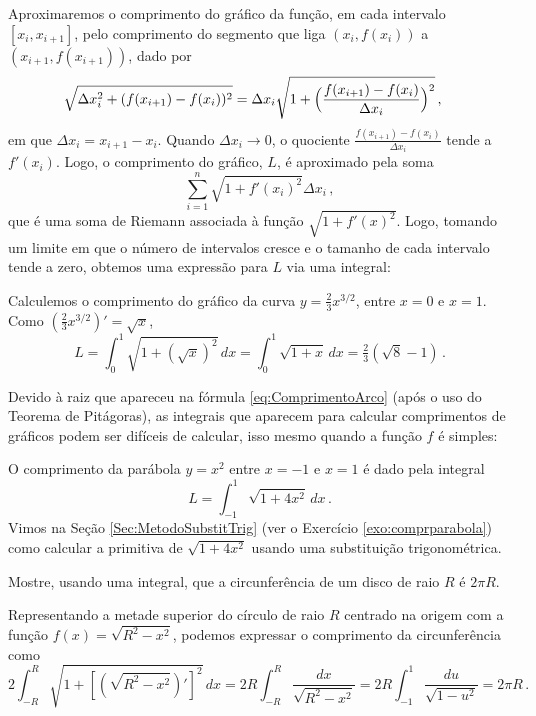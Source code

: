Aproximaremos o comprimento do gráfico da função, 
em cada intervalo $[x_i,x_{i+1}]$, pelo comprimento do segmento que liga 
$(x_i,f(x_i))$ a $(x_{i+1},f(x_{i+1}))$, dado por 
\begin{align*}
 \sqrt{\Delta x_i^2+(f(x_{i+1})-f(x_i))^2}
&=\Delta x_i\sqrt{1+\Bigl(\frac{f(x_{i+1})-f(x_i)}{\Delta x_i}\Bigr)^2}\,,
\end{align*}
em que $\Delta x_i=x_{i+1}-x_i$. Quando $\Delta x_i\to 0$, o quociente 
$\frac{f(x_{i+1})-f(x_i)}{\Delta x_i}$ tende a $f'(x_i)$. Logo, o comprimento
do gráfico, $L$, é aproximado pela soma
$$\sum_{i=1}^n\sqrt{1+f'(x_i)^2}\Delta x_i\,,$$
que é uma soma de Riemann associada à função $\sqrt{1+f'(x)^2}$. Logo, 
tomando
um limite em que o número de intervalos cresce e o tamanho de cada intervalo
tende a zero,
obtemos uma expressão para $L$ via uma integral:

\begin{ex}
Calculemos o comprimento do gráfico da curva $y=\tfrac23 x^{3/2}$, entre $x=0$ e $x=1$.
Como $(\tfrac23 x^{3/2})'=\sqrt{x}$, 
$$
L=\int_0^1\sqrt{1+(\sqrt{x})^2}\,dx=\int_0^1\sqrt{1+x}\,dx=
\tfrac23(\sqrt{8}-1)\,.
$$
\end{ex}
Devido à raiz que apareceu na fórmula \eqref{eq:ComprimentoArco} (após o uso do
Teorema de Pitágoras), as integrais que aparecem para calcular comprimentos de
gráficos podem ser difíceis de calcular, isso mesmo quando a função $f$ é
simples:

\begin{ex}\label{ex:comprparabdifiss}
O comprimento da parábola $y=x^2$ entre $x=-1$ e $x=1$ é dado pela integral 
$$L=\int_{-1}^1\sqrt{1+4x^2}\,dx\,.$$
Vimos na Seção \ref{Sec:MetodoSubstitTrig} (ver o Exercício \ref{exo:comprparabola}) 
como calcular a primitiva de $\sqrt{1+4x^2}$ usando uma substituição
trigonométrica.
\end{ex}

\begin{exo}
Mostre, usando uma integral, que a circunferência de um disco de raio $R$ é $2\pi R$.
\begin{sol} Representando a metade superior do círculo de raio $R$ centrado na origem com a função $f(x)=\sqrt{R^2-x^2}$, podemos expressar o 
comprimento da circunferência como
$$
2\int_{-R}^R\sqrt{1+[(\sqrt{R^2-x^2})']^2}\,dx=2R\int_{-R}^R\frac{dx}{\sqrt{R^2-x^2}}=2R\int_{-1}^1\frac{du}{\sqrt{1-u^2}}=2\pi R\,.
$$
\end{sol}
\end{exo}

